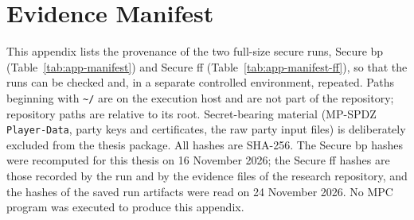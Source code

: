 \appendix
\renewcommand{\appendixtocname}{Appendix}
\renewcommand{\appendixpagename}{\appendixtocname}
\addappheadtotoc
{}
\appendixpage

\chapter{Evidence Manifest}\label{app:manifest}
This appendix lists the provenance of the two full-size secure runs, Secure \ac{bp} (Table~\ref{tab:app-manifest}) and Secure \ac{ff} (Table~\ref{tab:app-manifest-ff}), so that the runs can be checked and, in a separate controlled environment, repeated. Paths beginning with \texttt{\textasciitilde/} are on the execution host and are not part of the repository; repository paths are relative to its root. Secret-bearing material (MP-SPDZ \texttt{Player-Data}, party keys and certificates, the raw party input files) is deliberately excluded from the thesis package. All hashes are SHA-256. The Secure \ac{bp} hashes were recomputed for this thesis on 16 November 2026; the Secure \ac{ff} hashes are those recorded by the run and by the evidence files of the research repository, and the hashes of the saved run artifacts were read on 24 November 2026. No MPC program was executed to produce this appendix.

